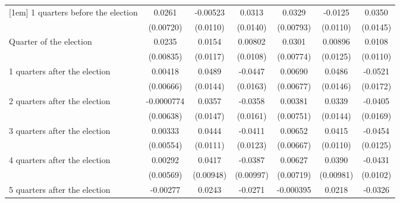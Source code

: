 \begin{table}[!ht]
\begin{tabular}{l*{6}{c}}
[1em]
 1 quarters before the election&      0.0261\sym{***}&    -0.00523         &      0.0313\sym{*}  &      0.0329\sym{***}&     -0.0125         &      0.0350\sym{*}  \\
                    &   (0.00720)         &    (0.0110)         &    (0.0140)         &   (0.00793)         &    (0.0110)         &    (0.0145)         \\
[1em]
Quarter of the election&      0.0235\sym{**} &      0.0154         &     0.00802         &      0.0301\sym{***}&     0.00896         &      0.0108         \\
                    &   (0.00835)         &    (0.0117)         &    (0.0108)         &   (0.00774)         &    (0.0125)         &    (0.0110)         \\
[1em]
 1 quarters after the election&     0.00418         &      0.0489\sym{***}&     -0.0447\sym{**} &     0.00690         &      0.0486\sym{***}&     -0.0521\sym{**} \\
                    &   (0.00666)         &    (0.0144)         &    (0.0163)         &   (0.00677)         &    (0.0146)         &    (0.0172)         \\
[1em]
 2 quarters after the election&  -0.0000774         &      0.0357\sym{*}  &     -0.0358\sym{*}  &     0.00381         &      0.0339\sym{*}  &     -0.0405\sym{*}  \\
                    &   (0.00638)         &    (0.0147)         &    (0.0161)         &   (0.00751)         &    (0.0144)         &    (0.0169)         \\
[1em]
 3 quarters after the election&     0.00333         &      0.0444\sym{***}&     -0.0411\sym{***}&     0.00652         &      0.0415\sym{***}&     -0.0454\sym{***}\\
                    &   (0.00554)         &    (0.0111)         &    (0.0123)         &   (0.00667)         &    (0.0110)         &    (0.0125)         \\
[1em]
 4 quarters after the election&     0.00292         &      0.0417\sym{***}&     -0.0387\sym{***}&     0.00627         &      0.0390\sym{***}&     -0.0431\sym{***}\\
                    &   (0.00569)         &   (0.00948)         &   (0.00997)         &   (0.00719)         &   (0.00981)         &    (0.0102)         \\
[1em]
 5 quarters after the election&    -0.00277         &      0.0243\sym{*}  &     -0.0271\sym{**} &   -0.000395         &      0.0218\sym{*}  &     -0.0326\sym{**} \\

\end{tabular}
\end{table}
